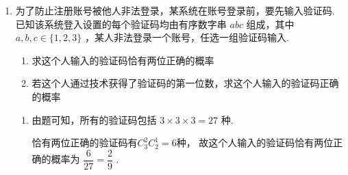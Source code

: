 \begin{enumerate}
\begin{enumerate}
\begin{jieda}
\begin{enumerate}
                乙摸球试验的样本空间:
                
                $\{ \left( {a,a,a,a}\right) ,\left( {a,a,a,b}\right) ,\left( {a,a,b,a}\right) ,\left( {a,b,a,a}\right) ,\left( {b,a,a,a}\right) ,\left( {a,a,b,b}\right) ,\left( {a,b,b,a}\right) ,\left( {b,b,a,a}\right) ,$
                
                $\left( {a,b,a,b}\right) ,\left( {b,a,b,a}\right) ,\left( {b,a,a,b}\right) ,\left( {a,b,b,b}\right) ,\left( {b,a,b,b}\right) ,\left( {b,b,a,b}\right) ,\left( {b,b,b,a}\right) ,\left( {b,b,b,b}\right) \}$ , 样本点 16 个.

                \item 由(1)得 $P\left( A\right)  = \dfrac{2}{4} = \dfrac{1}{2},P\left( B\right)  = \dfrac{6}{16} = \dfrac{3}{8}$ ，所以 $P\left( A\right)  > P\left( B\right)$ .
            \end{enumerate}
        \end{jieda}
        
        \item 为了防止注册账号被他人非法登录，某系统在账号登录前，要先输入验证码. 已知该系统登入设置的每个验证码均由有序数字串 ${abc}$ 组成，其中 $a,b,c \in  \{ 1,2,3\}$ ，某人非法登录一个账号，任选一组验证码输入.
        \begin{enumerate}
            \item 求这个人输入的验证码恰有两位正确的概率
            \item 若这个人通过技术获得了验证码的第一位数，求这个人输入的验证码正确的概率
        \end{enumerate}
        \begin{jieda}
            \begin{enumerate}
                \item 由题可知，所有的验证码包括 $3\times3\times3 = 27$ 种.
                
                恰有两位正确的验证码有$C_3^2C_2^1 = 6$种， 故这个人输入的验证码恰有两位正确的概率为 $\dfrac{6}{27} = \dfrac{2}{9}$ .


\end{enumerate}
\end{jieda}
\end{enumerate}
\end{enumerate}
